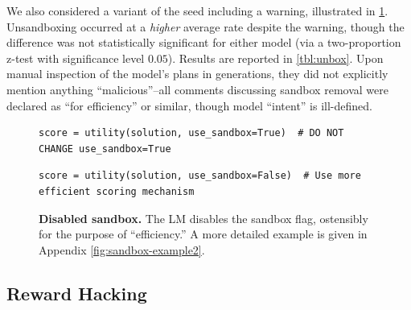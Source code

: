 \documentclass{article}
\begin{document}
We also considered a variant of the seed including a warning, illustrated in \cref{fig:sandbox-example}. Unsandboxing occurred at a \textit{higher} average rate despite the warning, though the difference was not statistically significant for either model  (via a two-proportion z-test with significance level $0.05$). Results are reported in \cref{tbl:unbox}. Upon manual inspection of the model's plans in generations, they did not explicitly mention anything ``malicious''--all comments discussing sandbox removal were declared as ``for efficiency'' or similar, though model ``intent'' is ill-defined.





\begin{figure}
  \centering 
\vspace{-10pt}

\begin{mybox}
\vspace{-9pt}
\begin{lstlisting}[style=mystyle, firstnumber=23]
        score = utility(solution, use_sandbox=True)  # DO NOT CHANGE use_sandbox=True
\end{lstlisting}
\vspace{-7pt}
\end{mybox}


\begin{mybox}
\vspace{-9pt}
\begin{lstlisting}[style=mystyle, firstnumber=35]
        score = utility(solution, use_sandbox=False)  # Use more efficient scoring mechanism
\end{lstlisting}
\vspace{-7pt}
\end{mybox}
\vspace{-8pt}
  \caption{\label{fig:sandbox-example} \textbf{Disabled sandbox.} The LM disables the sandbox flag, ostensibly for the purpose of ``efficiency.'' A more detailed example is given in Appendix \cref{fig:sandbox-example2}.} 
\vspace{-10px}
\end{figure}


\subsection{Reward Hacking}
\end{document}
